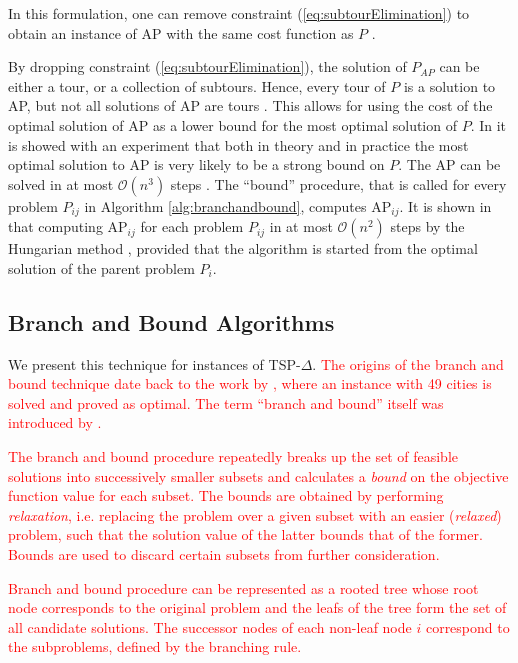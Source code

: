 \documentclass{mprop}
\theoremstyle{definition}
\begin{document}
In this formulation, one can remove constraint (\ref{eq:subtourElimination}) to obtain an instance of AP with the same cost function as $P$ \citep{Little63,Eastman58,Bellmore71}.

By dropping constraint (\ref{eq:subtourElimination}), the solution of $P_{AP}$ can be either a tour, or a collection of subtours. Hence, every tour of $P$ is a solution to AP, but not all solutions of AP are tours \citep{Bellmore71}. This allows for using the cost of the optimal solution of AP as a lower bound for the most optimal solution of $P$. In \cite{tspbible} it is showed with an experiment that both in theory and in practice the most optimal solution to AP is very likely to be a strong bound on $P$. The AP can be solved in at most $\mathcal{O}(n^{3})$ steps \citep{Kuhn55,Christofides75}. The ``bound'' procedure, that is called for every problem $P_{ij}$ in Algorithm \ref{alg:branchandbound}, computes AP$_{ij}$. It is shown in \cite{tspbible} that computing AP$_{ij}$ for each problem $P_{ij}$ in at most $\mathcal{O}(n^{2})$ steps by the Hungarian method \citep{Kuhn55}, provided that the algorithm is started from the optimal solution of the parent problem $P_{i}$.


\subsection{Branch and Bound Algorithms}
\label{branchandbound}
We present this technique for instances of TSP-$\Delta$. 
\textcolor{red}{
The origins of the branch and bound technique date back to the work by \citet{Dantzig54}, where an instance with 49 cities is solved and proved as optimal. The term ``branch and bound'' itself was introduced by \citet{Little63}.} 

\textcolor{red}{The branch and bound procedure repeatedly breaks up the set of feasible solutions into successively smaller subsets and calculates a \textit{bound} on the objective function value for each subset. The bounds are obtained by performing \textit{relaxation}, i.e. replacing the problem over a given subset with an easier (\textit{relaxed}) problem, such that the solution value of the latter bounds that of the former. Bounds are used to discard certain subsets from further consideration.}

\textcolor{red}{
Branch and bound procedure can be represented as a rooted tree whose root node corresponds to the original problem and the leafs of the tree form the set of all candidate solutions. The successor nodes of each non-leaf node $i$ correspond to the subproblems, defined by the branching rule.}
\end{document}
